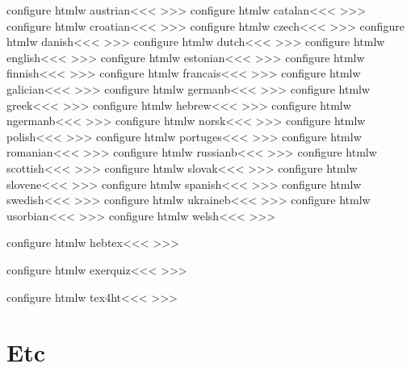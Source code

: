 \<configure htmlw austrian\><<<
\def\A:charset{charset=windows-1252}
>>>
\<configure htmlw catalan\><<<
\def\A:charset{charset=windows-1252}
>>>
\<configure htmlw croatian\><<<
\def\A:charset{charset=windows-1251}
>>>
\<configure htmlw czech\><<<
\def\A:charset{charset=windows-1251}
>>>
\<configure htmlw danish\><<<
\def\A:charset{charset=windows-1252}
>>>
\<configure htmlw dutch\><<<
\def\A:charset{charset=windows-1252}
>>>
\<configure htmlw english\><<<
\def\A:charset{charset=windows-1251}
>>>
\<configure htmlw estonian\><<<
\def\A:charset{charset=windows-1251}
>>>
\<configure htmlw finnish\><<<
\def\A:charset{charset=windows-1252}
>>>
\<configure htmlw francais\><<<
\def\A:charset{charset=windows-1252}
>>>
\<configure htmlw galician\><<<
\def\A:charset{charset=windows-1252}
>>>
\<configure htmlw germanb\><<<
\def\A:charset{charset=windows-1252}
>>>
\<configure htmlw greek\><<<
\def\A:charset{charset=windows-1253}
>>>
\<configure htmlw hebrew\><<<
\def\A:charset{charset=windows-1255}
>>>
\<configure htmlw ngermanb\><<<
\def\A:charset{charset=windows-1252}
>>>
\<configure htmlw norsk\><<<
\def\A:charset{charset=windows-1252}
>>>
\<configure htmlw polish\><<<
\def\A:charset{charset=windows-1252}
>>>
\<configure htmlw portuges\><<<
\def\A:charset{charset=windows-1252}
>>>
\<configure htmlw romanian\><<<
\def\A:charset{charset=windows-1250}
>>>
\<configure htmlw russianb\><<<
\def\A:charset{charset=windows-1251}
>>>
\<configure htmlw scottish\><<<
\def\A:charset{charset=windows-1252}
>>>
\<configure htmlw slovak\><<<
\def\A:charset{charset=windows-1250}
>>>
\<configure htmlw slovene\><<<
\def\A:charset{charset=windows-1250}
>>>
\<configure htmlw spanish\><<<
\def\A:charset{charset=windows-1252}
>>>
\<configure htmlw swedish\><<<
\def\A:charset{charset=windows-1252}
>>>
\<configure htmlw ukraineb\><<<
\def\A:charset{charset=windows-1251}
>>>
\<configure htmlw usorbian\><<<
\def\A:charset{charset=windows-1252}
>>>
\<configure htmlw welsh\><<<
\def\A:charset{charset=windows-1252}
>>>


\<configure htmlw hebtex\><<<
\def\A:charset{charset=windows-1255}
>>>

\<configure htmlw exerquiz\><<<
\def\A:charset{charset=windows-1252}  
>>>


\<configure htmlw tex4ht\><<<
\def\A:charset{charset=windows-1252} 
>>>

\section{Etc}





